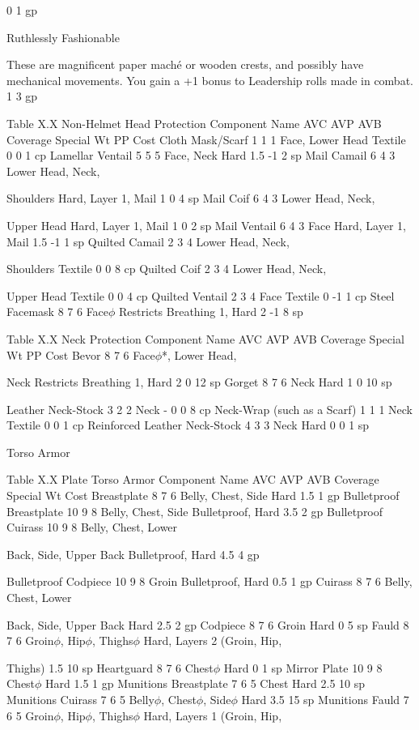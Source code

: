 \documentclass[oneside,11pt,english]{book}
\begin{document}
0 1 gp

Ruthlessly 
Fashionable

These are magnificent paper maché or wooden crests, and possibly have mechanical 
movements. You gain a +1 bonus to Leadership rolls made in combat. 1 3 gp

Table X.X Non-Helmet Head Protection
Component Name AVC AVP AVB Coverage Special Wt PP Cost
Cloth Mask/Scarf 1 1 1 Face, Lower Head Textile 0 0 1 cp
Lamellar Ventail 5 5 5 Face, Neck Hard 1.5 -1 2 sp
Mail Camail 6 4 3 Lower Head, Neck, 

Shoulders Hard, Layer 1, Mail 1 0 4 sp
Mail Coif 6 4 3 Lower Head, Neck,

Upper Head Hard, Layer 1, Mail 1 0 2 sp
Mail Ventail 6 4 3 Face Hard, Layer 1, Mail 1.5 -1 1 sp
Quilted Camail 2 3 4 Lower Head, Neck, 

Shoulders Textile 0 0 8 cp
Quilted Coif 2 3 4 Lower Head, Neck,

Upper Head Textile 0 0 4 cp
Quilted Ventail 2 3 4 Face Textile 0 -1 1 cp
Steel Facemask 8 7 6 Face$\phi$ Restricts Breathing 1, Hard 2 -1 8 sp

Table X.X Neck Protection
Component Name AVC AVP AVB Coverage Special Wt PP Cost
Bevor 8 7 6 Face$\phi$*, Lower Head, 

Neck Restricts Breathing 1, Hard 2 0 12 sp
Gorget 8 7 6 Neck Hard 1 0 10 sp


Leather Neck-Stock 3 2 2 Neck - 0 0 8 cp
Neck-Wrap (such 
as a Scarf) 1 1 1 Neck Textile 0 0 1 cp
Reinforced Leather
Neck-Stock 4 3 3 Neck Hard 0 0 1 sp

Torso Armor

Table X.X Plate Torso Armor
Component Name AVC AVP AVB Coverage Special Wt Cost
Breastplate 8 7 6 Belly, Chest, Side Hard 1.5 1 gp
Bulletproof 
Breastplate 10 9 8 Belly, Chest, Side Bulletproof, Hard 3.5 2 gp
Bulletproof Cuirass 10 9 8 Belly, Chest, Lower 

Back, Side, Upper Back Bulletproof, Hard 4.5 4 gp

Bulletproof 
Codpiece 10 9 8 Groin Bulletproof, Hard 0.5 1 gp
Cuirass 8 7 6 Belly, Chest, Lower 

Back, Side, Upper Back Hard 2.5 2 gp
Codpiece 8 7 6 Groin Hard 0 5 sp
Fauld 8 7 6 Groin$\phi$, Hip$\phi$, Thighs$\phi$ Hard, Layers 2 (Groin, Hip, 

Thighs) 1.5 10 sp
Heartguard 8 7 6 Chest$\phi$ Hard 0 1 sp
Mirror Plate 10 9 8 Chest$\phi$ Hard 1.5 1 gp
Munitions 
Breastplate 7 6 5 Chest Hard 2.5 10 sp
Munitions Cuirass 7 6 5 Belly$\phi$, Chest$\phi$, Side$\phi$ Hard 3.5 15 sp
Munitions Fauld 7 6 5 Groin$\phi$, Hip$\phi$, Thighs$\phi$ Hard, Layers 1 (Groin, Hip, 
\end{document}
